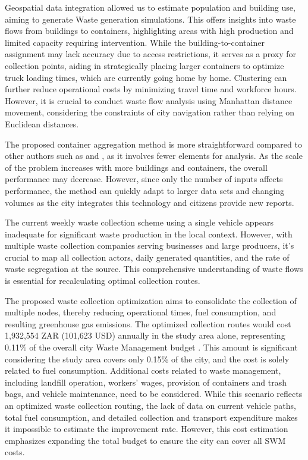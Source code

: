 \documentclass[authoryear,preprint,review,doubleblind, 12pt]{elsarticle}
\begin{document}
Geospatial data integration allowed us to estimate population and building use, aiming to generate Waste generation simulations. This offers insights into waste flows from buildings to containers, highlighting areas with high production and limited capacity requiring intervention. While the building-to-container assignment may lack accuracy due to access restrictions, it serves as a proxy for collection points, aiding in strategically placing larger containers to optimize truck loading times, which are currently going home by home. Clustering can further reduce operational costs by minimizing travel time and workforce hours. However, it is crucial to conduct waste flow analysis using Manhattan distance movement, considering the constraints of city navigation rather than relying on Euclidean distances.

    The proposed container aggregation method is more straightforward compared to other authors such as \citet{al-refaieOptimizationModelsClustering2020} and \citet{viktorinHierarchicalClusteringbasedAlgorithms2023}, as it involves fewer elements for analysis. As the scale of the problem increases with more buildings and containers, the overall performance may decrease. However, since only the number of inputs affects performance, the method can quickly adapt to larger data sets and changing volumes as the city integrates this technology and citizens provide new reports.

    The current weekly waste collection scheme using a single vehicle appears inadequate for significant waste production in the local context. However, with multiple waste collection companies serving businesses and large producers, it's crucial to map all collection actors, daily generated quantities, and the rate of waste segregation at the source. This comprehensive understanding of waste flows is essential for recalculating optimal collection routes.

    The proposed waste collection optimization aims to consolidate the collection of multiple nodes, thereby reducing operational times, fuel consumption, and resulting greenhouse gas emissions. The optimized collection routes would cost 1,932,554 ZAR (101,623 USD) annually in the study area alone, representing 0.11\% of the overall city Waste Management budget \citep{tshwane20232024MediumtermRevenue2023}. This amount is significant considering the study area covers only 0.15\% of the city, and the cost is solely related to fuel consumption. 
    Additional costs related to waste management, including landfill operation, workers' wages, provision of containers and trash bags, and vehicle maintenance, need to be considered. While this scenario reflects an optimized waste collection routing, the lack of data on current vehicle paths, total fuel consumption, and detailed collection and transport expenditure makes it impossible to estimate the improvement rate. However, this cost estimation emphasizes expanding the total budget to ensure the city can cover all SWM costs.
    
\end{document}
